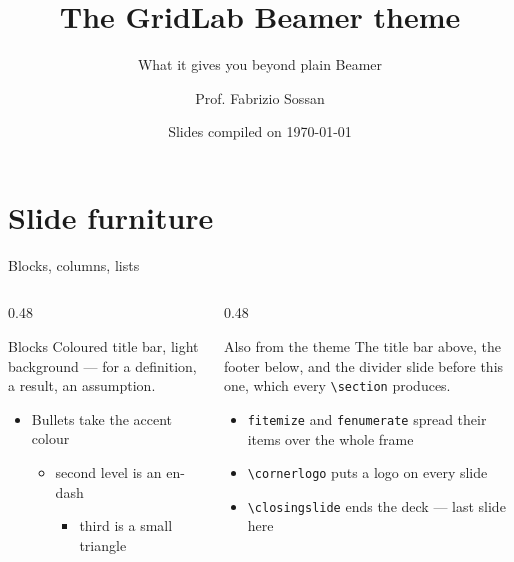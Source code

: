 \documentclass[aspectratio=169,10pt]{beamer}
\title[Theme feature tour]{The GridLab Beamer theme}
\subtitle{What it gives you beyond plain Beamer}
\author[F. Sossan]{Prof. Fabrizio Sossan}
\institute{Gridlab, HES-SO Valais-Wallis\\fabrizio.sossan@hevs.ch}
\date{Slides compiled on \today}
\begin{document}
\begin{frame}
  \titlepage
\end{frame}

\section{Slide furniture}

\begin{frame}{Blocks, columns, lists}
  \begin{columns}[T,onlytextwidth]
    \begin{column}{0.48\textwidth}
      \begin{block}{Blocks}
        Coloured title bar, light background — for a definition, a result, an
        assumption.
      \end{block}
      \begin{itemize}
        \item Bullets take the accent colour
          \begin{itemize}
            \item second level is an en-dash
              \begin{itemize}
                \item third is a small triangle
              \end{itemize}
          \end{itemize}
      \end{itemize}
    \end{column}
    \begin{column}{0.48\textwidth}
      \begin{block}{Also from the theme}
        The title bar above, the footer below, and the divider slide before
        this one, which every \texttt{\textbackslash section} produces.
      \end{block}
      \begin{itemize}
        \item \texttt{fitemize} and \texttt{fenumerate} spread their items
              over the whole frame
        \item \texttt{\textbackslash cornerlogo} puts a logo on every slide
        \item \texttt{\textbackslash closingslide} ends the deck — last slide
              here
      \end{itemize}
    \end{column}
  \end{columns}
\end{frame}
\end{document}

